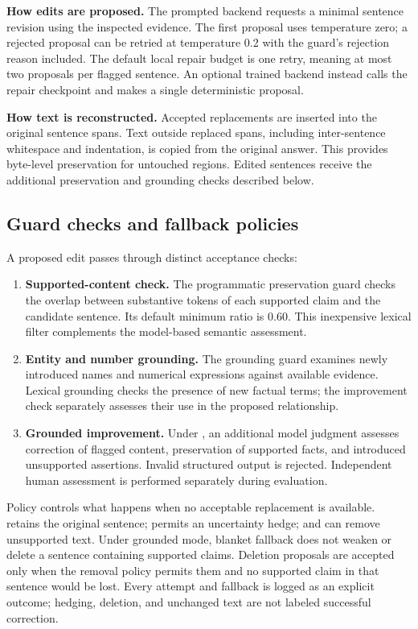 \documentclass[11pt,a4paper]{article}
\newcommand{\code}[1]{\texttt{\detokenize{#1}}}
\begin{document}
\textbf{How edits are proposed.} The prompted backend requests a minimal sentence revision using the inspected evidence. The first proposal uses temperature zero; a rejected proposal can be retried at temperature 0.2 with the guard's rejection reason included. The default local repair budget is one retry, meaning at most two proposals per flagged sentence. An optional trained backend instead calls the repair checkpoint and makes a single deterministic proposal.

\textbf{How text is reconstructed.} Accepted replacements are inserted into the original sentence spans. Text outside replaced spans, including inter-sentence whitespace and indentation, is copied from the original answer. This provides byte-level preservation for untouched regions. Edited sentences receive the additional preservation and grounding checks described below.

\subsection{Guard checks and fallback policies}
A proposed edit passes through distinct acceptance checks:
\begin{enumerate}
\item \textbf{Supported-content check.} The programmatic preservation guard checks the overlap between substantive tokens of each supported claim and the candidate sentence. Its default minimum ratio is 0.60. This inexpensive lexical filter complements the model-based semantic assessment.
\item \textbf{Entity and number grounding.} The grounding guard examines newly introduced names and numerical expressions against available evidence. Lexical grounding checks the presence of new factual terms; the improvement check separately assesses their use in the proposed relationship.
\item \textbf{Grounded improvement.} Under \code{grounded_v1}, an additional model judgment assesses correction of flagged content, preservation of supported facts, and introduced unsupported assertions. Invalid structured output is rejected. Independent human assessment is performed separately during evaluation.
\end{enumerate}
Policy controls what happens when no acceptable replacement is available. \code{rewrite-only} retains the original sentence; \code{rewrite+hedge} permits an uncertainty hedge; and \code{rewrite+remove} can remove unsupported text. Under grounded mode, blanket fallback does not weaken or delete a sentence containing supported claims. Deletion proposals are accepted only when the removal policy permits them and no supported claim in that sentence would be lost. Every attempt and fallback is logged as an explicit outcome; hedging, deletion, and unchanged text are not labeled successful correction.
\end{document}
